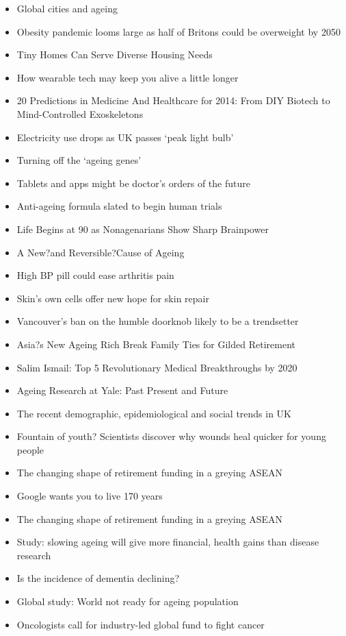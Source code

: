 \begin{itemize}
\item Global cities and ageing
\item Obesity pandemic looms large as half of Britons could be overweight by 2050
\item Tiny Homes Can Serve Diverse Housing Needs
\item How wearable tech may keep you alive a little longer
\item 20 Predictions in Medicine And Healthcare for 2014: From DIY Biotech to Mind-Controlled Exoskeletons
\item Electricity use drops as UK passes `peak light bulb'
\item Turning off the `ageing genes'
\item Tablets and apps might be doctor's orders of the future
\item Anti-ageing formula slated to begin human trials
\item Life Begins at 90 as Nonagenarians Show Sharp Brainpower
\item A New?and Reversible?Cause of Ageing
\item High BP pill could ease arthritis pain
\item Skin's own cells offer new hope for skin repair
\item Vancouver's ban on the humble doorknob likely to be a trendsetter
\item Asia?s New Ageing Rich Break Family Ties for Gilded Retirement
\item Salim Ismail: Top 5 Revolutionary Medical Breakthroughs by 2020
\item Ageing Research at Yale: Past Present and Future
\item The recent demographic, epidemiological and social trends in UK
\item Fountain of youth? Scientists discover why wounds heal quicker for young people
\item The changing shape of retirement funding in a greying ASEAN
\item Google wants you to live 170 years
\item The changing shape of retirement funding in a greying ASEAN
\item Study: slowing ageing will give more financial, health gains than disease research
\item Is the incidence of dementia declining?
\item Global study: World not ready for ageing population
\item Oncologists call for industry-led global fund to fight cancer

\end{itemize}
